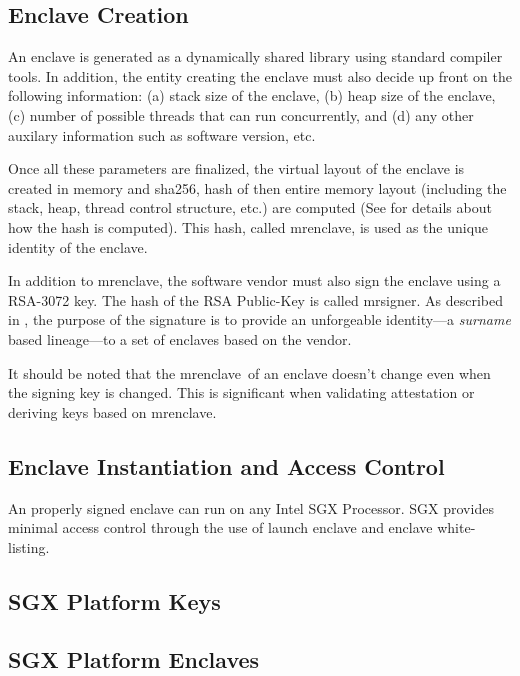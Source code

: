 \documentclass[11pt]{article}
\newcommand{\mrenclave}{\textsf{mrenclave}}
\newcommand{\mrsigner}{\textsf{mrsigner}}
\newcommand{\sha}{\textsf{sha256}}
\begin{document}
  \begin{center}
  
  \end{center}

  \subsection{Enclave Creation}
  An enclave is generated as a dynamically shared library using
  standard compiler tools. In addition, the entity creating the
  enclave must also decide up front on the following information:  (a)
  stack size of the enclave, (b) heap size of the enclave, (c) number
  of possible threads that can run concurrently, and (d) any other
  auxilary information such as software version, etc.

  Once all these parameters are finalized, the virtual layout of the
  enclave is created in memory and \sha,  hash of then
  entire memory layout (including the stack, heap, thread control
  structure, etc.) are computed (See \cite{intelsdm} for details
  about how the hash is computed). This hash, called
  \mrenclave, is used as the unique identity of the enclave.

  In addition to \textsf{mrenclave}, the software vendor must
  also sign the enclave using a RSA-3072 key. The hash of the RSA
  Public-Key is called \mrsigner. As described in
  \cite{surnaming}, the purpose of the signature is to provide an
  unforgeable identity---a \textit{surname} based lineage---to a set
  of enclaves based on the vendor.

  It should be noted that the \mrenclave\ of an enclave doesn't
  change even when the signing key is changed. This is
  significant when validating attestation or deriving keys based on
  \mrenclave.

  \subsection{Enclave Instantiation and Access Control}
  An properly signed enclave can run on any Intel SGX Processor. SGX
  provides minimal access control through the use of launch enclave
  and enclave white-listing.

  \subsection{SGX Platform Keys}
  \subsection{SGX Platform Enclaves}
\end{document}
